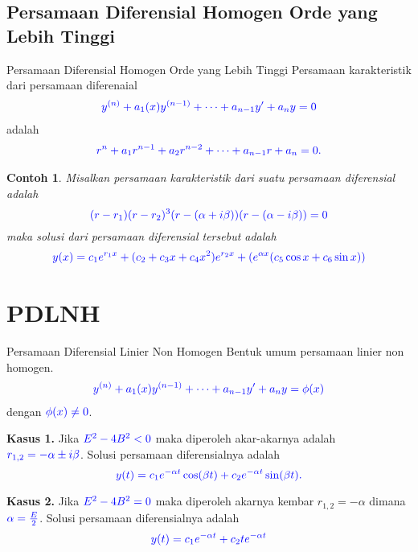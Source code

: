 \documentclass{beamer}
\newtheorem{contoh}{Contoh}
\begin{document}
\subsection{Persamaan Diferensial Homogen Orde yang Lebih Tinggi}
\begin{frame}{Persamaan Diferensial Homogen Orde yang Lebih Tinggi}
Persamaan karakteristik dari persamaan diferenaial
\begin{align*}
\color{blue} y^{(n)}+a_1(x)y^{(n-1)}+\cdots+a_{n-1}y'+a_ny=0
\end{align*}
adalah 
\begin{align*}
\color{blue} r^n+a_1r^{n-1}+a_2r^{n-2}+\cdots+a_{n-1}r+a_n=0.
\end{align*}
\begin{contoh}
	Misalkan persamaan karakteristik dari suatu persamaan diferensial adalah $$\color{blue}(r-r_1)(r-r_2)^3(r-(\alpha+i\beta))(r-(\alpha-i\beta))=0$$
	maka solusi dari persamaan diferensial tersebut adalah
	\begin{align*}
	\color{blue} y(x)=c_1e^{r_1x}+(c_2+c_3x+c_4x^2)e^{r_2x}+(e^{\alpha x}(c_5\cos x+c_6\sin x))
	\end{align*}
\end{contoh}
\end{frame}

\section{PDLNH}
\begin{frame}{Persamaan Diferensial Linier Non Homogen}
	Bentuk umum persamaan linier non homogen.
	\begin{align*}
	\color{blue} y^{(n)}+a_1(x)y^{(n-1)}+\cdots+a_{n-1}y'+a_ny=\phi(x)
	\end{align*}
	dengan $\color{blue}\phi(x)\neq 0$. 
\end{frame}


\begin{frame}
	\textbf{Kasus 1.} Jika $\color{blue}E^2-4B^2<0$ maka diperoleh akar-akarnya adalah $\color{blue}r_{1,2}=-\alpha\pm i\beta$. Solusi persamaan diferensialnya adalah
	$$\color{blue}y(t)=c_1e^{-\alpha t}\cos(\beta t)+c_2e^{-\alpha t}\sin(\beta t).$$
\end{frame}
\begin{frame}
	\textbf{Kasus 2.} Jika $\color{blue}E^2-4B^2=0$ maka diperoleh akarnya kembar $r_{1,2}=-\alpha$ dimana $\color{blue}\alpha=\frac{E}{2}$. Solusi persamaan diferensialnya adalah
	$$\color{blue}y(t)=c_1e^{-\alpha t}+c_2te^{-\alpha t}$$
\end{frame}
\end{document}
